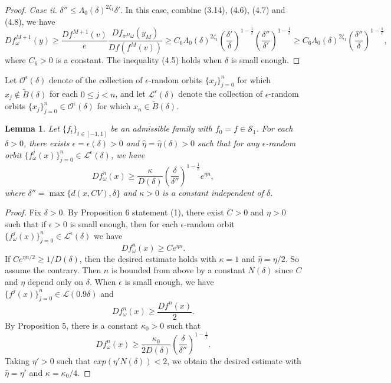 \documentclass[11pt,oneside]{article}
\theoremstyle{plain}
\newtheorem{lem}{Lemma}[section]
\numberwithin{equation}{section}
\numberwithin{figure}{section}
\numberwithin{table}{section}
\begin{document}
\begin{proof}
{\it Case ii.} $\delta'' \leq \Lambda_0(\delta)^{2 \zeta_1} \delta' $. In this case, combine (3.14), (4.6), (4.7) and (4.8), we have
\[
Df_{\omega}^{M+1}(y)  \geq \frac{Df^{M+1}(v)}{e} \frac{Df_{\sigma^M \omega}(y_M)}{Df(f^M(v))}  \geq C_6 \Lambda_0(\delta)^{2 \zeta_1} \left( \frac{\delta'}{\delta} \right)^{1 - \frac{1}{\ell}} \left( \frac{\delta''}{\delta'} \right)^{1 - \frac{1}{\ell}}  \geq C_6 \Lambda_0(\delta)^{2 \zeta_1} \left( \frac{\delta''}{\delta} \right)^{1 - \frac{1}{\ell}},
\]
where $C_6 > 0$ is a constant. The inequality (4.5) holds when $\delta$ is small enough. 

\end{proof}


Let $\mathcal O^{\epsilon} (\delta)$ denote of the collection of $\epsilon$-random orbits $\{x_j \}_{j=0}^n$ for which $x_j \notin \tilde B(\delta)$ for each $0 \leq j < n$, and let $\mathcal L^{\epsilon}(\delta)$ denote the collection of $\epsilon$-random orbits $\{x_j \}_{j=0}^n \in \mathcal O^{\epsilon} (\delta)$ for which $x_n \in \tilde B(\delta)$. 


\begin{lem}
Let $\{f_t \}_{t \in [-1, 1]} $ be an admissible family with $f_0 =f \in \mathcal S_1$. For each $\delta > 0$, there exists $\epsilon = \epsilon(\delta) > 0$ and $\hat \eta = \hat \eta(\delta) > 0$ such that for any $\epsilon$-random orbit $\{ f_{\omega}^j(x) \}_{j=0}^n \in \mathcal L^{\epsilon}(\delta)$, we have
\[
Df_{\omega}^n(x) \geq \frac{\kappa}{D(\delta)} \left( \frac{\delta}{\delta''} \right)^{1 - \frac{1}{\ell}}e^{\hat \eta n},
\]
where $\delta'' = \max\{ d(x, CV), \delta\}$ and $\kappa > 0$ is a constant independent of $\delta$.
\end{lem}


\begin{proof}


Fix $\delta >0$. By Proposition 6 statement (1), there exist $C>0$ and $\eta >0$ such that if $\epsilon > 0$ is small enough, then for each $\epsilon$-random orbit $\{ f_{\omega}^j(x) \}_{j=0}^n \in \mathcal L^{\epsilon}(\delta)$ we have
\[
Df_{\omega}^n(x) \geq C e^{\eta n}.
\]
If $C e^{\eta n/2} \geq 1 / D(\delta)$, then the desired estimate holds with $\kappa = 1$ and $\hat \eta = \eta/2$. So assume the contrary. Then $n$ is bounded from above by a constant $N(\delta)$ since $C$ and $\eta$ depend only on $\delta$. When $\epsilon$ is small enough, we have $\{ f^j(x) \}_{j=0}^n \in \mathcal L(0.9 \delta)$ and 
\[
D f_{\omega}^n(x) \geq \frac{Df^n(x)}{2}.
\]
By Proposition 5, there is a constant $\kappa_0 > 0$ such that 
\[
D f_{\omega}^n(x) \geq \frac{\kappa_0}{2D(\delta)} \left( \frac{\delta}{\delta''} \right)^{1 - \frac{1}{\ell}}.
\]
Taking $\eta' >0$ such that $exp(\eta' N(\delta)) < 2$, we obtain the desired estimate with $\hat \eta = \eta '$ and $\kappa = \kappa_0 /4$.


\end{proof}
\end{document}
